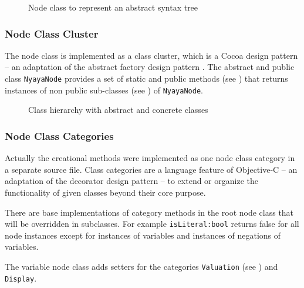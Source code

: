 \begin{figure}[htbp]
\begin{center}
\caption{Node class to represent an abstract syntax tree}
\label{fig:NyayaNode}
\end{center}
\end{figure}

\subsubsection{Node Class Cluster}

The node class is implemented as a class cluster, 
which is a Cocoa design pattern \cite[p.282ff]{Buck:2009:CDP:1803585}
– an adaptation of the abstract factory design pattern \cite[p.87ff]{GAMMAETAL}.
The abstract and public class \verb+NyayaNode+ 
provides a set of static and public methods (see )
that returns instances of non public sub-classes (see )
of \verb+NyayaNode+.

\begin{figure}[htbp]
\begin{center}
\caption{Class hierarchy with abstract and concrete classes}
\label{fig:NyayaNodeCluster}
\end{center}
\end{figure}

\subsubsection{Node Class Categories}

Actually the creational methods were implemented as one node class category in a separate source file. 
Class categories are a language feature of Objective-C \cite[p.225ff]{Kochan:2009:PO:1538451}
– an adaptation of the decorator design pattern \cite[p.175ff]{GAMMAETAL} – 
to extend or organize the functionality of given classes beyond their core purpose.

There are base implementations of category methods in the root node class
that will be overridden in subclasses.
For example \verb+isLiteral:bool+ returns false for all node instances
except for instances of variables
and instances of negations of variables.

The variable node class adds setters for the categories \verb+Valuation+  
(see ) and \verb+Display+.



